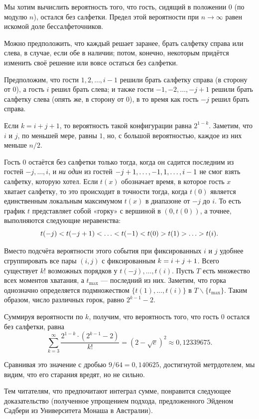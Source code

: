 Мы хотим вычислить вероятность того, что гость, сидящий в положении 0 (по модулю $n$), остался без салфетки.
Предел этой вероятности при $n\to\infty$ равен искомой доле бессалфеточников.

Можно предположить, что каждый решает заранее, брать салфетку справа или слева, в случае, если обе в наличии;
потом, конечно, некоторым придётся изменить своё решение или вовсе остаться без салфетки.

Предположим, что гости $1,2,\dots, i - 1$ решили брать салфетку справа  (в сторону от 0), а гость $i$ решил брать слева;
и также гости $-1,-2,\dots, -j + 1$ решили брать салфетку слева (опять же, в сторону от 0), в то время как гость $-j$ решил брать справа.

Если $k = i+j+1$, то вероятность такой конфигурации равна $2^{1-k}$.
Заметим, что $i$ и $j$, по меньшей мере, равны $1$, но, с большой вероятностью, каждое из них меньше $n/2$.

Гость $0$ остаётся без салфетки только тогда, когда он садится последним из гостей $-j,\dots,i$, и \emph{ни один} из гостей $-j\z+1,\z\dots,-1,1,\dots,i-1$ не смог взять салфетку, которую хотел.
Если $t(x)$ обозначает время, в которое гость $x$ хватает салфетку, то это происходит в точности тогда, когда $t(0)$ является единственным локальным максимумом $t(x)$ в диапазоне от $-j$ до $i$.
То есть график $t$ представляет собой «горку» с вершиной в $(0,t(0))$, 
а точнее, выполняются следующие неравенства: 
\[t(-j)\z<t(-j+1) \z<\z\dots\z<t(-1)\z<t(0)\z>t(1)\z>\z\dots\z>t(i).\]

Вместо подсчёта вероятности этого события при фиксированных $i$ и $j$ удобнее сгруппировать все пары $(i, j)$ с фиксированным $k=i\z+j+1$.
Всего существует $k!$ возможных порядков у $t(-j),\dots, t (i)$.
Пусть $T$ есть множество всех моментов хватания, а $t_{{\max}}$ --- последний из них. 
Заметим, что горка однозначно определяется подмножеством $\{t(1),\dots,t(i)\}$ в $T\backslash \{t_{{\max}}\}$.
Таким образом, число различных горок, равно $2^{k-1}-2$.

Суммируя вероятности по $k$, получим, что вероятность того, что гость 0 остался без салфетки, равна
\[\sum_{k=3}^\infty\frac{2^{1-k}\cdot(2^{k-1}-2)}{k!}=(2-\sqrt{e})^2\approx 0{,}12339675.\]
\heartf

Сравнивая это значение с дробью $9/64 = 0{,}140625$, достигнутой метрдотелем, мы видим, что его старания вредят, но не сильно.

\medskip

Тем читателям, что предпочитают интеграл сумме, понравится следующее доказательство (полученное упрощением подхода, предложенного Эйденом Садбери из Университета Монаша в Австралии).


